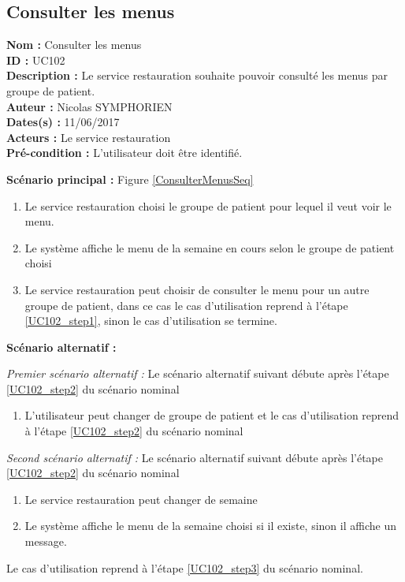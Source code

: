 \subsection{Consulter les menus}

\noindent\textbf{Nom :} Consulter les menus \\
\textbf{ID :} UC102 \\
\textbf{Description :} Le service restauration souhaite pouvoir consulté les menus par groupe de patient. \\
\textbf{Auteur :} Nicolas SYMPHORIEN \\
\textbf{Dates(s) :} 11/06/2017 \\
\textbf{Acteurs :} Le service restauration \\
\textbf{Pré-condition :} L'utilisateur doit être identifié.

\noindent \textbf{Scénario principal :} Figure \ref{ConsulterMenusSeq}

\begin{enumerate}
	\item \label{UC102_step1}Le service restauration choisi le groupe de patient pour lequel il veut voir le menu.
	\item \label{UC102_step2}Le système affiche le menu de la semaine en cours selon le groupe de patient choisi
	\item \label{UC102_step3}Le service restauration peut choisir de consulter le menu pour un autre groupe de patient, dans ce cas le cas d'utilisation reprend à l'étape \ref{UC102_step1}, sinon le cas d'utilisation se termine.
\end{enumerate}

\noindent \textbf{Scénario alternatif :}

\textit{Premier scénario alternatif :}
Le scénario alternatif suivant débute après l'étape \ref{UC102_step2} du scénario nominal
\begin{enumerate}
	\item L'utilisateur peut changer de groupe de patient et le cas d'utilisation reprend à l'étape \ref{UC102_step2} du scénario nominal
\end{enumerate}

\textit{Second scénario alternatif :}
Le scénario alternatif suivant débute après l'étape \ref{UC102_step2} du scénario nominal
\begin{enumerate}
	\item Le service restauration peut changer de semaine
	\item Le système affiche le menu de la semaine choisi si il existe, sinon il affiche un message. 
\end{enumerate}
Le cas d'utilisation reprend à l'étape \ref{UC102_step3} du scénario nominal.

